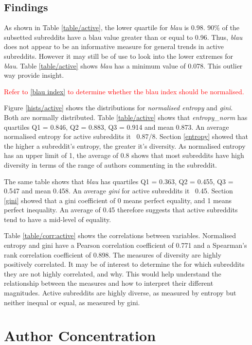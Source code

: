 \documentclass{article}
\begin{document}
\subsection{Findings}

As shown in Table \ref{table/active}, the lower quartile for \textit{blau} is 0.98. 90\% of the subsetted subreddits have a blau value greater than or equal to 0.96.  Thus, \textit{blau} does not appear to be an informative measure for general trends in active subreddits. However it may still be of use to look into the lower extremes for \textit{blau}. Table \ref{table/active} shows \textit{blau} has a minimum value of 0.078. This outlier way provide insight.

\textcolor{red}{Refer to \ref{blau index} to determine whether the blau index should be normalised.}

Figure \ref{hists/active} shows the distributions for \textit{normalised entropy} and \textit{gini}. Both are normally distributed. Table \ref{table/active} shows that \textit{entropy\_norm} has quartiles Q1 = 0.846, Q2 = 0.883, Q3 = 0.914 and mean 0.873. An average normalised entropy for active subreddits it ~0.87/8. Section \ref{entropy} showed that the higher a subreddit's entropy, the greater it's diversity. As normalised entropy has an upper limit of 1, the average of 0.8 shows that most subreddits have high diversity in terms of the range of authors commenting in the subreddit.

The same table shows that \textit{blau} has quartiles Q1 = 0.363, Q2 = 0.455, Q3 = 0.547 and mean 0.458. An average \textit{gini} for active subreddits it ~0.45. Section \ref{gini} showed that a gini coefficient of 0 means perfect equality, and 1 means perfect inequality. An average of 0.45 therefore suggests that active subreddits tend to have a mid-level of equality.

Table \ref{table/corr:active} shows the correlations between variables. Normalised entropy and gini have a Pearson correlation coefficient of 0.771 and a Spearman's rank correlation coefficient of 0.898. The measures of diversity are highly positively correlated. It may be of interest to determine the for which subreddits they are not highly correlated, and why. This would help understand the relationship between the measures and how to interpret their different magnitudes. Active subreddits are highly diverse, as measured by entropy but neither inequal or equal, as measured by gini.


\section{Author Concentration}
\end{document}
